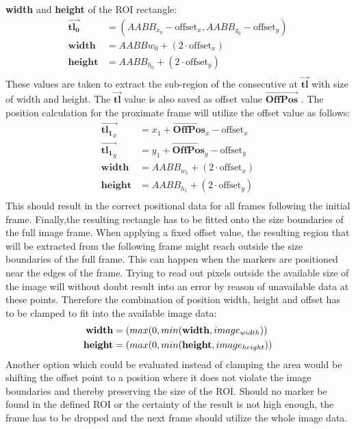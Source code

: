 \textbf{width} and \textbf{height} of the ROI rectangle:
\begin{equation}
\begin{split}
\vec{\mathbf{tl_{0}}}&=(AABB_{x_{0}}-\text{offset}_{x},AABB_{y_{0}}-\text{offset}_{y})\\
\mathbf{width}&=AABB{w_{0}}+(2\cdot\text{offset}_{x})\\
\mathbf{height}&=AABB_{h_{0}}+(2\cdot\text{offset}_{y})\\
\end{split}
\end{equation}
These values are taken to extract the sub-region of the consecutive at $\vec{\mathbf{tl}}$ with size of width and height. The $\vec{\mathbf{tl}}$ value is also saved as offset value $\vec{\mathbf{OffPos}}$ .
The position calculation for the proximate frame will utilize the offset value as follows:
\begin{equation}
\begin{split}
\vec{\mathbf{tl_{1}}_{x}}&=x_{1}+\vec{\mathbf{OffPos}}_{x}-\text{offset}_{x} \\ \vec{\mathbf{tl_{1}}_{y}}&=y_{1}+\vec{\mathbf{OffPos}}_{y}-\text{offset}_{y}\\
\mathbf{width}&=AABB_{w_{1}}+(2\cdot\text{offset}_{x})\\
\mathbf{height}&=AABB_{h_{1}}+(2\cdot\text{offset}_{y})\\
\end{split}
\end{equation}
This should result in the correct positional data for all frames following the initial frame.
Finally,the resulting rectangle has to be fitted onto the size boundaries of the full image frame. When applying a fixed offset value, the resulting region that will be extracted from the following frame might reach outside the size boundaries of the full frame. This can happen when the markers are positioned near the edges of the frame. Trying to read out pixels outside the available size of the image will without doubt result into an error by reason of unavailable data at these points. Therefore the combination of position width, height and offset has to be clamped to fit into the available image data:
\begin{equation}
\begin{split}
\textbf{width}&=\text(max(0,min(\mathbf{width},image_{width}))\\
\textbf{height}&=\text(max(0,min(\mathbf{height},image_{height}))
\end{split}
\end{equation}
Another option which could be evaluated instead of clamping the area would be shifting the offset point to a position where it does not violate the image boundaries and  thereby preserving the size of the ROI.
Should no marker be found in the defined ROI or the certainty of the result is not high enough, the frame has to be dropped and the next frame should utilize the whole image data.
